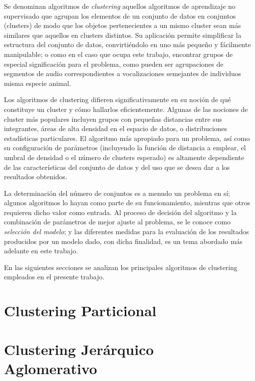 Se denominan algoritmos de \textit{clustering} aquellos algoritmos de aprendizaje no supervisado que agrupan los elementos de un conjunto de datos en conjuntos (clusters) de modo que los objetos pertenecientes a un mismo cluster sean más similares que aquellos en clusters distintos.
Su aplicación permite simplificar la estructura del conjunto de datos, convirtiéndolo en uno más pequeño y fácilmente manipulable;
o como en el caso que ocupa este trabajo, encontrar grupos de especial significación para el problema, como pueden ser agrupaciones de segmentos de audio correspondientes a vocalizaciones semejantes de individuos misma especie animal.

Los algoritmos de clustering difieren significativamente en su noción de qué constituye un cluster y cómo hallarlos eficientemente.
Algunas de las nociones de cluster más populares incluyen grupos con pequeñas distancias entre sus integrantes, áreas de alta densidad en el espacio de datos, o distribuciones estadísticas particulares.
El algoritmo más apropiado para un problema, así como su configuración de parámetros (incluyendo la función de distancia a emplear, el umbral de densidad o el número de clusters esperado) es altamente dependiente de las características del conjunto de datos y del uso que se desea dar a los resultados obtenidos.

La determinación del número de conjuntos es a menudo un problema en sí;
algunos algoritmos lo hayan como parte de su funcionamiento, mientras que otros requieren dicho valor como entrada.
Al proceso de decisión del algoritmo y la combinación de parámetros de mejor ajuste al problema, se le conoce como \textit{selección del modelo};
y las diferentes medidas para la evaluación de los resultados producidos por un modelo dado, con dicha finalidad, es un tema abordado más adelante en este trabajo.

En las siguientes secciones se analizan los principales algoritmos de clustering empleados en el presente trabajo.

\section{Clustering Particional}\label{sec:clusteringParticional}


\section{Clustering Jerárquico Aglomerativo}\label{sec:clusteringJerárquicoAglomerativo}


